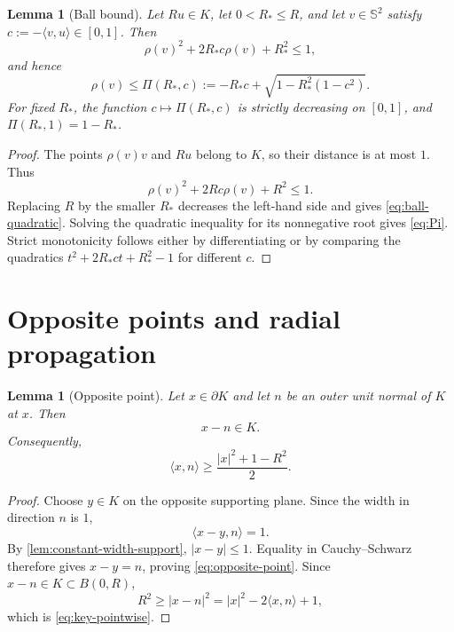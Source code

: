\documentclass[11pt,reqno]{amsart}
\numberwithin{equation}{section}
\newtheorem{lemma}[theorem]{Lemma}
\theoremstyle{definition}
\theoremstyle{remark}
\newcommand{\Sph}{\mathbb{S}^{2}}
\newcommand{\ip}[2]{\langle #1,#2\rangle}
\begin{document}
\begin{lemma}[Ball bound]\label{lem:ball-bound}
Let $Ru\in K$, let $0<R_{*}\leq R$, and let $v\in\Sph$ satisfy
$c:=-\ip{v}{u}\in[0,1]$. Then
\begin{equation}\label{eq:ball-quadratic}
 \rho(v)^{2}+2R_{*}c\rho(v)+R_{*}^{2}\leq1,
\end{equation}
and hence
\begin{equation}\label{eq:Pi}
 \rho(v)\leq \Pi(R_{*},c)
 :=-R_{*}c+\sqrt{1-R_{*}^{2}(1-c^{2})}.
\end{equation}
For fixed $R_{*}$, the function $c\mapsto\Pi(R_{*},c)$ is strictly decreasing on $[0,1]$, and $\Pi(R_{*},1)=1-R_{*}$.
\end{lemma}

\begin{proof}
The points $\rho(v)v$ and $Ru$ belong to $K$, so their distance is at most $1$. Thus
\[
 \rho(v)^{2}+2Rc\rho(v)+R^{2}\leq1.
\]
Replacing $R$ by the smaller $R_{*}$ decreases the left-hand side and gives \eqref{eq:ball-quadratic}. Solving the quadratic inequality for its nonnegative root gives \eqref{eq:Pi}. Strict monotonicity follows either by differentiating or by comparing the quadratics
$t^{2}+2R_{*}ct+R_{*}^{2}-1$ for different $c$.
\end{proof}

\section{Opposite points and radial propagation}\label{sec:radial}

\begin{lemma}[Opposite point]\label{lem:opposite-point}
Let $x\in\partial K$ and let $n$ be an outer unit normal of $K$ at $x$. Then
\begin{equation}\label{eq:opposite-point}
 x-n\in K.
\end{equation}
Consequently,
\begin{equation}\label{eq:key-pointwise}
 \ip{x}{n}\geq\frac{|x|^{2}+1-R^{2}}2.
\end{equation}
\end{lemma}

\begin{proof}
Choose $y\in K$ on the opposite supporting plane. Since the width in direction $n$ is $1$,
\[
 \ip{x-y}{n}=1.
\]
By \cref{lem:constant-width-support}, $|x-y|\leq1$. Equality in Cauchy--Schwarz therefore gives $x-y=n$, proving \eqref{eq:opposite-point}. Since $x-n\in K\subset B(0,R)$,
\[
 R^{2}\geq|x-n|^{2}=|x|^{2}-2\ip{x}{n}+1,
\]
which is \eqref{eq:key-pointwise}.
\end{proof}
\end{document}
